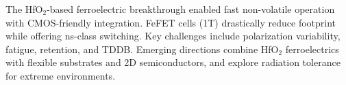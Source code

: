 
\noindent
The HfO$_2$-based ferroelectric breakthrough enabled fast non-volatile operation with CMOS-friendly integration. FeFET cells (1T) drastically reduce footprint while offering ns-class switching. Key challenges include polarization variability, fatigue, retention, and TDDB. Emerging directions combine HfO$_2$ ferroelectrics with flexible substrates and 2D semiconductors, and explore radiation tolerance for extreme environments.
